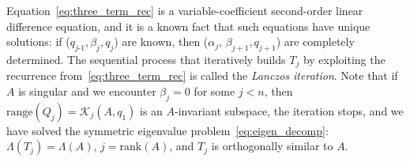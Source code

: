 \documentclass[10pt]{article}
\numberwithin{equation}{section}
\newcommand{\+}{%
	\raisebox{0.18ex}{\scaleobj{0.55}{+}}
}
\theoremstyle{definition}
\begin{document}
Equation~\eqref{eq:three_term_rec} is a variable-coefficient second-order linear difference equation, and it is a known fact that such equations have unique solutions: if ($q_{j\text{-}1}, \beta_j, q_j$) are known, then ($\alpha_j$, $\beta_{j+1}, q_{j+1}$) are completely determined. 
The sequential process that iteratively builds $T_j$ by exploiting the recurrence from~\eqref{eq:three_term_rec} is called the \emph{Lanczos iteration}. 
Note that if $A$ is singular and we encounter $\beta_j = 0$ for some $j < n$, then $\mathrm{range}(Q_j) = \mathcal{K}_j(A, q_1)$ is an $A$-invariant subspace, the iteration stops, and we have solved the symmetric eigenvalue problem~\eqref{eq:eigen_decomp}: $\Lambda(T_j) = \Lambda(A)$, $j = \mathrm{rank}(A)$, and $T_j$ is orthogonally similar to $A$. 
\end{document}
